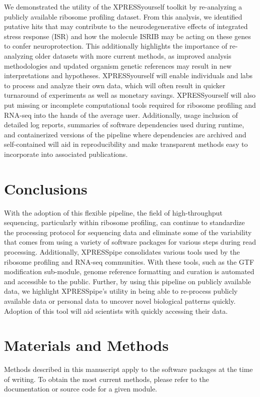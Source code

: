 \documentclass[10pt, oneside]{article}
\begin{document}
We demonstrated the utility of the XPRESSyourself toolkit by re-analyzing a publicly available ribosome profiling dataset. From this analysis, we identified putative hits that may contribute to the neurodegenerative effects of integrated stress response (ISR) and how the molecule ISRIB may be acting on these genes to confer neuroprotection. This additionally highlights the importance of re-analyzing older datasets with more current methods, as improved analysis methodologies and updated organism genetic references may result in new interpretations and hypotheses. XPRESSyourself will enable individuals and labs to process and analyze their own data, which will often result in quicker turnaround of experiments as well as monetary savings. XPRESSyourself will also put missing or incomplete computational tools required for ribosome profiling and RNA-seq into the hands of the average user. Additionally, usage inclusion of detailed log reports, summaries of software dependencies used during runtime, and containerized versions of the pipeline where dependencies are archived and self-contained will aid in reproducibility and make transparent methods easy to incorporate into associated publications. \par


\section{Conclusions}
With the adoption of this flexible pipeline, the field of high-throughput sequencing, particularly within ribosome profiling, can continue to standardize the processing protocol for sequencing data and eliminate some of the variability that comes from using a variety of software packages for various steps during read processing. Additionally, XPRESSpipe consolidates various tools used by the ribosome profiling and RNA-seq communities. With these tools, such as the GTF modification sub-module, genome reference formatting and curation is automated and accessible to the public. Further, by using this pipeline on publicly available data, we highlight XPRESSpipe's utility in being able to re-process publicly available data or personal data to uncover novel biological patterns quickly. Adoption of this tool will aid scientists with quickly accessing their data.


\section{Materials and Methods}
Methods described in this manuscript apply to the software packages at the time of writing. To obtain the most current methods, please refer to the documentation or source code for a given module.
\end{document}
